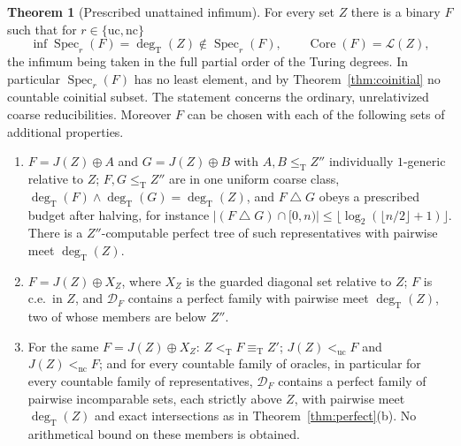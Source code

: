 \documentclass[11pt,letterpaper]{article}
\theoremstyle{definition}
\newtheorem{theorem}[definition]{Theorem}
\numberwithin{equation}{section}
\newcommand{\leT}{\le_{\mathrm T}}
\newcommand{\eqT}{\equiv_{\mathrm T}}
\newcommand{\ltT}{<_{\mathrm T}}
\newcommand{\nc}{\mathrm{nc}}
\newcommand{\uc}{\mathrm{uc}}
\newcommand{\DX}[1]{\mathcal D_{#1}}
\newcommand{\Low}{\mathcal L}
\newcommand{\Core}{\operatorname{Core}}
\newcommand{\Spec}{\operatorname{Spec}}
\newcommand{\degT}{\deg_{\mathrm T}}
\newcommand{\J}{J}
\newcommand{\sd}{\mathbin{\triangle}}
\newcommand{\src}[1]{\leavevmode{\sffamily\footnotesize\color{Steel}[#1]}}
\begin{document}
\begin{theorem}[Prescribed unattained infimum]\label{thm:infimum}\src{R2, R5, R7, R8, R9}
For every set $Z$ there is a binary $F$ such that for $r\in\{\uc,\nc\}$
\[
 \inf\Spec_r(F)=\degT(Z)\notin\Spec_r(F),\qquad\Core(F)=\Low(Z),
\]
the infimum being taken in the full partial order of the Turing degrees. In particular $\Spec_r(F)$ has no least element, and by Theorem~\ref{thm:coinitial} no countable coinitial subset. The statement concerns the ordinary, unrelativized coarse reducibilities. Moreover $F$ can be chosen with each of the following sets of additional properties.
\begin{enumerate}[label=\textup{(\Roman*)},leftmargin=2.4em]
\item \src{R2, R7} $F=\J(Z)\oplus A$ and $G=\J(Z)\oplus B$ with $A,B\leT Z''$ individually $1$-generic relative to $Z$; $F,G\leT Z''$ are in one uniform coarse class, $\degT(F)\wedge\degT(G)=\degT(Z)$, and $F\sd G$ obeys a prescribed budget after halving, for instance $|(F\sd G)\cap[0,n)|\le\lfloor\log_2(\lfloor n/2\rfloor+1)\rfloor$. There is a $Z''$-computable perfect tree of such representatives with pairwise meet $\degT(Z)$.
\item \src{R5} $F=\J(Z)\oplus X_Z$, where $X_Z$ is the guarded diagonal set relative to $Z$; $F$ is c.e.\ in $Z$, and $\DX F$ contains a perfect family with pairwise meet $\degT(Z)$, two of whose members are below $Z''$.
\item \src{R8, R9} For the same $F=\J(Z)\oplus X_Z$: $Z\ltT F\eqT Z'$; $\J(Z)<_{\uc}F$ and $\J(Z)<_{\nc}F$; and for every countable family of oracles, in particular for every countable family of representatives, $\DX F$ contains a perfect family of pairwise incomparable sets, each strictly above $Z$, with pairwise meet $\degT(Z)$ and exact intersections as in Theorem~\ref{thm:perfect}\textup{(b)}. No arithmetical bound on these members is obtained.
\end{enumerate}
\end{theorem}
\end{document}
